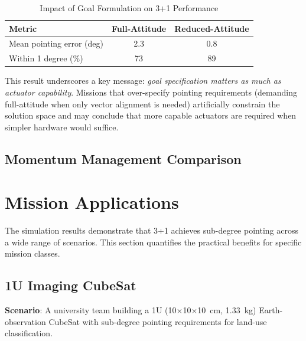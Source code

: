 \documentclass[9pt]{extarticle}
\begin{document}
\begin{table}[h]
    \centering
    \caption{Impact of Goal Formulation on 3+1 Performance}
    \label{tab:goal_impact}
    \begin{tabular}{lcc}
        \toprule
        Metric & Full-Attitude & Reduced-Attitude \\
        \midrule
        Mean pointing error (deg) & 2.3 & 0.8 \\
        Within 1 degree (\%) & 73 & 89 \\
        \bottomrule
    \end{tabular}
\end{table}

This result underscores a key message: \emph{goal specification matters as much as actuator capability}. Missions that over-specify pointing requirements (demanding full-attitude when only vector alignment is needed) artificially constrain the solution space and may conclude that more capable actuators are required when simpler hardware would suffice.

\subsection{Momentum Management Comparison}



\section{Mission Applications}\label{sec:applications}

The simulation results demonstrate that 3+1 achieves sub-degree pointing across a wide range of scenarios. This section quantifies the practical benefits for specific mission classes.

\subsection{1U Imaging CubeSat}

\textbf{Scenario}: A university team building a 1U (10$\times$10$\times$10~cm, 1.33~kg) Earth-observation CubeSat with sub-degree pointing requirements for land-use classification.
\end{document}
